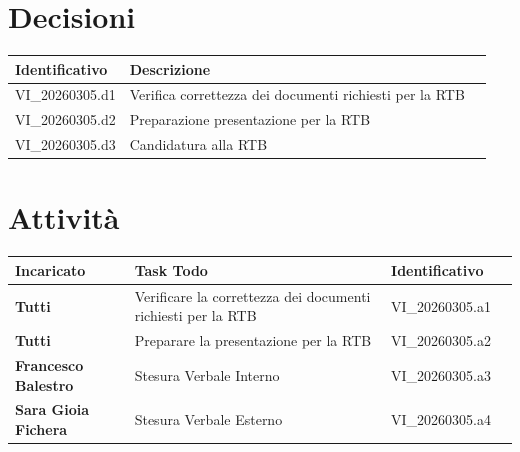 \documentclass[a4paper,12pt]{article}
\begin{document}
    \section{Decisioni} {
        \begin{tabularx}{\textwidth}{|l|X|l|}
            \hline
            \textbf{Identificativo} & \textbf{Descrizione}\\
            \hline
            VI\_20260305.d1 & Verifica correttezza dei documenti richiesti per la RTB\\
            \hline
            VI\_20260305.d2 & Preparazione presentazione per la RTB\\
            \hline
            VI\_20260305.d3 & Candidatura alla RTB\\
            \hline
        \end{tabularx}
    }

    \section{Attività} {
        \begin{tabularx}{\textwidth}{|l|X|l|l|}
            \hline
            \textbf{Incaricato} & \textbf{Task Todo} & \textbf{Identificativo} \\
            \hline
            \textbf{Tutti} & Verificare la correttezza dei documenti richiesti per la RTB & VI\_20260305.a1 \\
            \hline
            \textbf{Tutti} & Preparare la presentazione per la RTB & VI\_20260305.a2 \\
            \hline
            \textbf{Francesco Balestro} & Stesura Verbale Interno & VI\_20260305.a3 \\
            \hline
            \textbf{Sara Gioia Fichera} & Stesura Verbale Esterno & VI\_20260305.a4 \\
            \hline
        \end{tabularx}
    }
\end{document}
